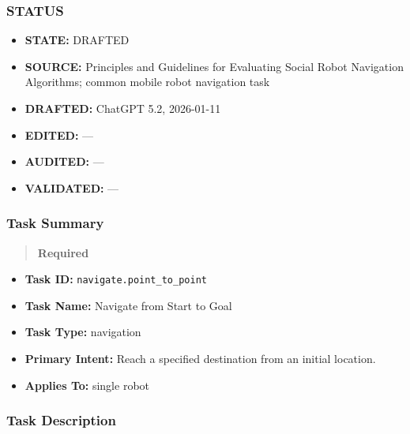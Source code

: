 \documentclass[utf8]{frontiers_suppmat} %
\providecommand{\tightlist}{%
  \setlength{\itemsep}{0pt}\setlength{\parskip}{0pt}}
\begin{document}
\subsubsection{STATUS}\label{status}

\begin{itemize}
\tightlist
\item
  \textbf{STATE:} DRAFTED\\
\item
  \textbf{SOURCE:} Principles and Guidelines for Evaluating Social Robot
  Navigation Algorithms; common mobile robot navigation task\\
\item
  \textbf{DRAFTED:} ChatGPT 5.2, 2026-01-11\\
\item
  \textbf{EDITED:} ---\\
\item
  \textbf{AUDITED:} ---\\
\item
  \textbf{VALIDATED:} ---
\end{itemize}

\subsubsection{Task Summary}\label{task-summary}

\begin{quote}
\textbf{Required}
\end{quote}

\begin{itemize}
\tightlist
\item
  \textbf{Task ID:} \texttt{navigate.point\_to\_point}\\
\item
  \textbf{Task Name:} Navigate from Start to Goal\\
\item
  \textbf{Task Type:} navigation\\
\item
  \textbf{Primary Intent:} Reach a specified destination from an initial
  location.\\
\item
  \textbf{Applies To:} single robot
\end{itemize}

\subsubsection{Task Description}\label{task-description}
\end{document}
